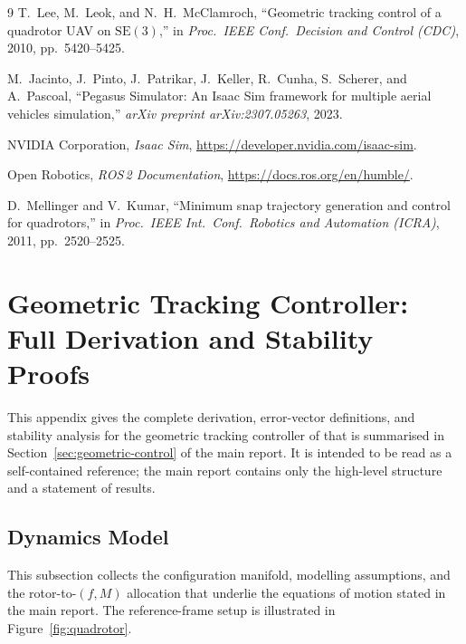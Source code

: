 \documentclass[11pt]{article}
\theoremstyle{remark}
\begin{document}
\begin{thebibliography}{9}
T.~Lee, M.~Leok, and N.~H.~McClamroch,
``Geometric tracking control of a quadrotor UAV on $\mathrm{SE}(3)$,''
in \emph{Proc.\ IEEE Conf.\ Decision and Control (CDC)}, 2010, pp.\ 5420--5425.

M.~Jacinto, J.~Pinto, J.~Patrikar, J.~Keller, R.~Cunha, S.~Scherer, and A.~Pascoal,
``Pegasus Simulator: An Isaac Sim framework for multiple aerial vehicles simulation,''
\emph{arXiv preprint arXiv:2307.05263}, 2023.

NVIDIA Corporation, \emph{Isaac Sim}, \url{https://developer.nvidia.com/isaac-sim}.

Open Robotics, \emph{ROS\,2 Documentation}, \url{https://docs.ros.org/en/humble/}.

D.~Mellinger and V.~Kumar,
``Minimum snap trajectory generation and control for quadrotors,''
in \emph{Proc.\ IEEE Int.\ Conf.\ Robotics and Automation (ICRA)}, 2011, pp.\ 2520--2525.
\end{thebibliography}

\newpage
\appendix

\section{Geometric Tracking Controller: Full Derivation and Stability Proofs}
\label{app:geometric-controller}

This appendix gives the complete derivation, error-vector definitions, and stability analysis for the geometric tracking controller of \cite{Lee2010CDC} that is summarised in Section~\ref{sec:geometric-control} of the main report. It is intended to be read as a self-contained reference; the main report contains only the high-level structure and a statement of results.

\subsection{Dynamics Model}
\label{app:dynamics}

This subsection collects the configuration manifold, modelling assumptions, and the rotor-to-$(f,M)$ allocation that underlie the equations of motion stated in the main report. The reference-frame setup is illustrated in Figure~\ref{fig:quadrotor}.
\end{document}
